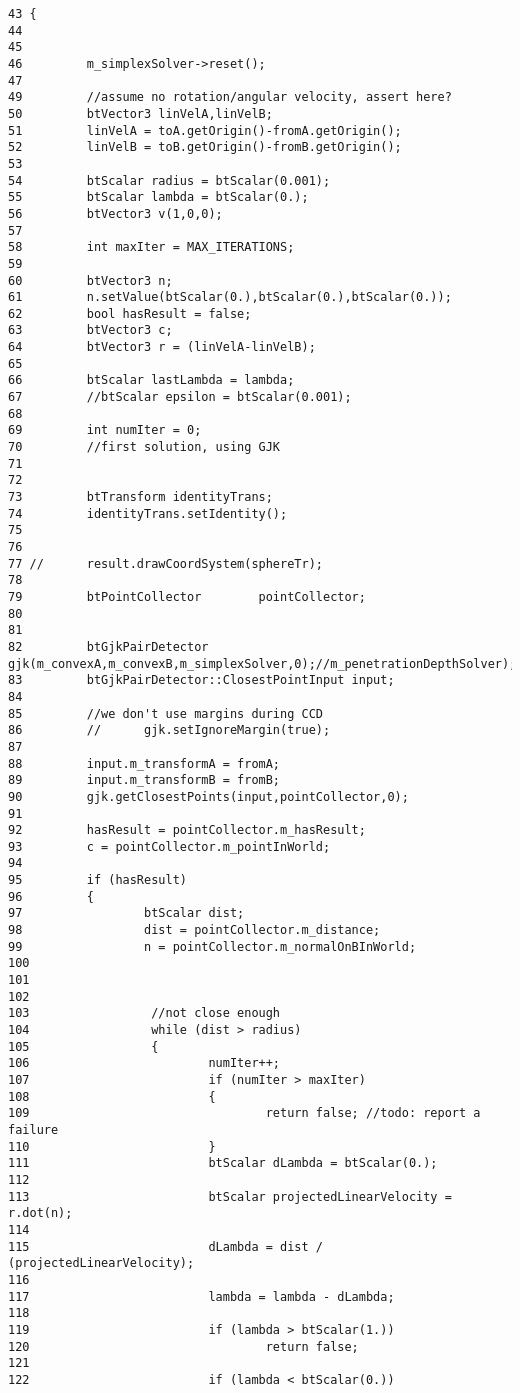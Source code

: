 \begin{Code}\begin{verbatim}43 {
44 
45 
46         m_simplexSolver->reset();
47 
49         //assume no rotation/angular velocity, assert here?
50         btVector3 linVelA,linVelB;
51         linVelA = toA.getOrigin()-fromA.getOrigin();
52         linVelB = toB.getOrigin()-fromB.getOrigin();
53 
54         btScalar radius = btScalar(0.001);
55         btScalar lambda = btScalar(0.);
56         btVector3 v(1,0,0);
57 
58         int maxIter = MAX_ITERATIONS;
59 
60         btVector3 n;
61         n.setValue(btScalar(0.),btScalar(0.),btScalar(0.));
62         bool hasResult = false;
63         btVector3 c;
64         btVector3 r = (linVelA-linVelB);
65 
66         btScalar lastLambda = lambda;
67         //btScalar epsilon = btScalar(0.001);
68 
69         int numIter = 0;
70         //first solution, using GJK
71 
72 
73         btTransform identityTrans;
74         identityTrans.setIdentity();
75 
76 
77 //      result.drawCoordSystem(sphereTr);
78 
79         btPointCollector        pointCollector;
80 
81                 
82         btGjkPairDetector gjk(m_convexA,m_convexB,m_simplexSolver,0);//m_penetrationDepthSolver);               
83         btGjkPairDetector::ClosestPointInput input;
84 
85         //we don't use margins during CCD
86         //      gjk.setIgnoreMargin(true);
87 
88         input.m_transformA = fromA;
89         input.m_transformB = fromB;
90         gjk.getClosestPoints(input,pointCollector,0);
91 
92         hasResult = pointCollector.m_hasResult;
93         c = pointCollector.m_pointInWorld;
94 
95         if (hasResult)
96         {
97                 btScalar dist;
98                 dist = pointCollector.m_distance;
99                 n = pointCollector.m_normalOnBInWorld;
100 
101         
102 
103                 //not close enough
104                 while (dist > radius)
105                 {
106                         numIter++;
107                         if (numIter > maxIter)
108                         {
109                                 return false; //todo: report a failure
110                         }
111                         btScalar dLambda = btScalar(0.);
112 
113                         btScalar projectedLinearVelocity = r.dot(n);
114                         
115                         dLambda = dist / (projectedLinearVelocity);
116 
117                         lambda = lambda - dLambda;
118 
119                         if (lambda > btScalar(1.))
120                                 return false;
121 
122                         if (lambda < btScalar(0.))

\end{verbatim}
\end{Code}
